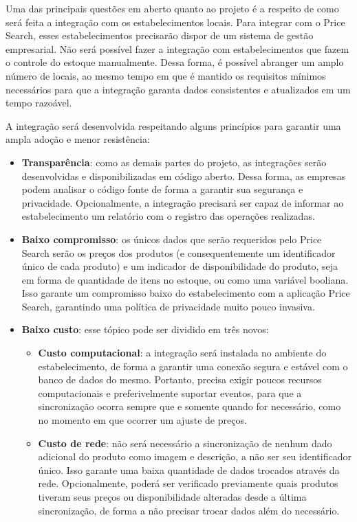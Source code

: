 Uma das principais questões em aberto quanto ao projeto é a respeito de como será feita a integração com os estabelecimentos locais. Para integrar com o Price Search, esses estabelecimentos precisarão dispor de um sistema de gestão empresarial. Não será possível fazer a integração com estabelecimentos que fazem o controle do estoque manualmente. Dessa forma, é possível abranger um amplo número de locais, ao mesmo tempo em que é mantido os requisitos mínimos necessários para que a integração garanta dados consistentes e atualizados em um tempo razoável.

A integração será desenvolvida respeitando alguns princípios para garantir uma ampla adoção e menor resistência:
\begin{itemize}
    \item \textbf{Transparência}: como as demais partes do projeto, as integrações serão desenvolvidas e disponibilizadas em código aberto. Dessa forma, as empresas podem analisar o código fonte de forma a garantir sua segurança e privacidade. Opcionalmente, a integração precisará ser capaz de informar ao estabelecimento um relatório com o registro das operações realizadas.
    \item \textbf{Baixo compromisso}: os únicos dados que serão requeridos pelo Price Search serão os preços dos produtos (e consequentemente um identificador único de cada produto) e um indicador de disponibilidade do produto, seja em forma de quantidade de itens no estoque, ou como uma variável booliana. Isso garante um compromisso baixo do estabelecimento com a aplicação Price Search, garantindo uma política de privacidade muito pouco invasiva.
    \item \textbf{Baixo custo}: esse tópico pode ser dividido em três novos:
    \begin{itemize}
        \item \textbf{Custo computacional}: a integração será instalada no ambiente do estabelecimento, de forma a garantir uma conexão segura e estável com o banco de dados do mesmo. Portanto, precisa exigir poucos recursos computacionais e preferivelmente suportar eventos, para que a sincronização ocorra sempre que e somente quando for necessário, como no momento em que ocorrer um ajuste de preços.
        \item \textbf{Custo de rede}: não será necessário a sincronização de nenhum dado adicional do produto como imagem e descrição, a não ser seu identificador único. Isso garante uma baixa quantidade de dados trocados através da rede. Opcionalmente, poderá ser verificado previamente quais produtos tiveram seus preços ou disponibilidade alteradas desde a última sincronização, de forma a não precisar trocar dados além do necessário.

\end{itemize}
\end{itemize}
